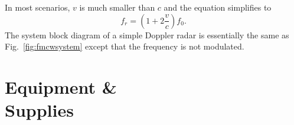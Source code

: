 \documentclass[letterpaper, 11pt]{article}
\begin{document}
In most scenarios, $v$ is much smaller than $c$ and the equation simplifies to 
\[
f_r = \left( 1+2\frac{v}{c}  \right) f_0. 
\]
The system block diagram of a simple Doppler radar is essentially the same as Fig.~\ref{fig:fmcwsystem} except that the frequency is not modulated. 

\vspace{3ex}

%
%

\newpage
\section{Equipment \& \\Supplies}
\end{document}

